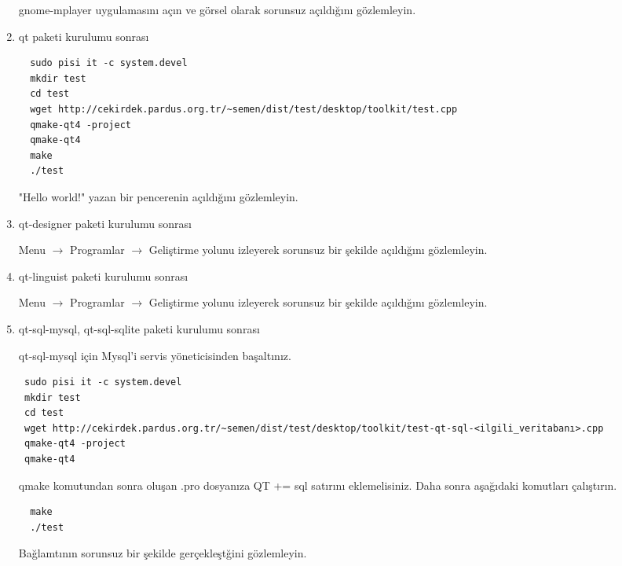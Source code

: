 \documentclass[a4paper,10pt]{article}
\begin{document}
\begin{enumerate}
gnome-mplayer uygulamasını açın ve görsel olarak sorunsuz açıldığını gözlemleyin.

 \item qt paketi kurulumu sonrası

\begin{verbatim}
  sudo pisi it -c system.devel
  mkdir test
  cd test
  wget http://cekirdek.pardus.org.tr/~semen/dist/test/desktop/toolkit/test.cpp
  qmake-qt4 -project
  qmake-qt4
  make
  ./test
\end{verbatim}

"Hello world!" yazan bir pencerenin açıldığını gözlemleyin.
\item qt-designer paketi kurulumu sonrası

Menu $\rightarrow$ Programlar $\rightarrow$ Geliştirme yolunu izleyerek sorunsuz bir şekilde açıldığını gözlemleyin.

\item qt-linguist paketi kurulumu sonrası

Menu $\rightarrow$ Programlar $\rightarrow$ Geliştirme yolunu izleyerek sorunsuz bir şekilde açıldığını gözlemleyin.

\item qt-sql-mysql, qt-sql-sqlite paketi kurulumu sonrası

qt-sql-mysql için Mysql'i servis yöneticisinden başaltınız.
\begin{verbatim}
 sudo pisi it -c system.devel
 mkdir test
 cd test
 wget http://cekirdek.pardus.org.tr/~semen/dist/test/desktop/toolkit/test-qt-sql-<ilgili_veritabanı>.cpp
 qmake-qt4 -project
 qmake-qt4	
\end{verbatim}
qmake komutundan sonra oluşan .pro dosyanıza QT += sql satırını eklemelisiniz. Daha sonra aşağıdaki komutları çalıştırın.
\begin{verbatim}
  make
  ./test
\end{verbatim}

Bağlamtının sorunsuz bir şekilde gerçekleştğini gözlemleyin.

\end{enumerate}
\end{document}
